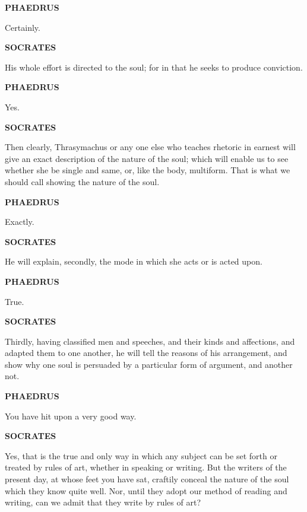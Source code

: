 \documentclass[11pt,letter]{article}
\begin{document}
\par \textbf{PHAEDRUS}
\par   Certainly.

\par \textbf{SOCRATES}
\par   His whole effort is directed to the soul; for in that he seeks to produce conviction.

\par \textbf{PHAEDRUS}
\par   Yes.

\par \textbf{SOCRATES}
\par   Then clearly, Thrasymachus or any one else who teaches rhetoric in earnest will give an exact description of the nature of the soul; which will enable us to see whether she be single and same, or, like the body, multiform. That is what we should call showing the nature of the soul.

\par \textbf{PHAEDRUS}
\par   Exactly.

\par \textbf{SOCRATES}
\par   He will explain, secondly, the mode in which she acts or is acted upon.

\par \textbf{PHAEDRUS}
\par   True.

\par \textbf{SOCRATES}
\par   Thirdly, having classified men and speeches, and their kinds and affections, and adapted them to one another, he will tell the reasons of his arrangement, and show why one soul is persuaded by a particular form of argument, and another not.

\par \textbf{PHAEDRUS}
\par   You have hit upon a very good way.

\par \textbf{SOCRATES}
\par   Yes, that is the true and only way in which any subject can be set forth or treated by rules of art, whether in speaking or writing. But the writers of the present day, at whose feet you have sat, craftily conceal the nature of the soul which they know quite well. Nor, until they adopt our method of reading and writing, can we admit that they write by rules of art?
\end{document}
